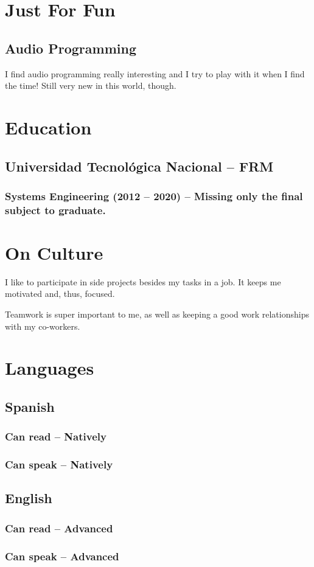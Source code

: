 \documentclass{article}
\begin{document}
\section{Just For Fun}
\subsection{Audio Programming}
  \begin{description}
    \item I find audio programming really interesting and I try to play with it when I find the time! Still very new in this world, though.
  \end{description}
\section{Education}
\subsection{Universidad Tecnológica Nacional – FRM}
\subsubsection{Systems Engineering (2012 – 2020) – Missing only the final subject to graduate.}
\section{On Culture}
  \begin{description}
    \item I like to participate in side projects besides my tasks in a job. It keeps me motivated and, thus, focused.
    \item Teamwork is super important to me, as well as keeping a good work relationships with my co-workers.
  \end{description}
\section{Languages}
\subsection{Spanish}
\subsubsection{Can read – Natively}
\subsubsection{Can speak – Natively}
\subsection{English}
\subsubsection{Can read – Advanced}
\subsubsection{Can speak – Advanced}
\end{document}
